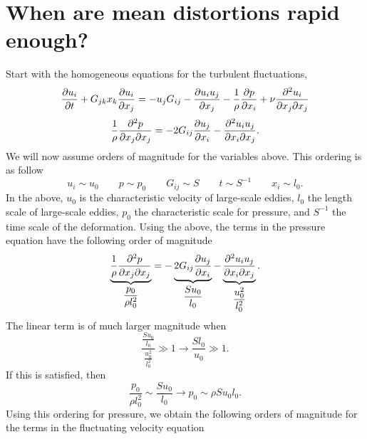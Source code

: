 \documentclass[oneside,a4paper,11pt]{report}
\begin{document}
\section{When are mean distortions rapid enough?}
Start with the homogeneous equations for the turbulent fluctuations,
\begin{equation}
\frac{\partial u_i}{\partial t} + G_{jk} x_k \frac{\partial u_i}{\partial x_j} = -u_j G_{ij} - \frac{\partial u_i u_j}{\partial x_j} - \frac{1}{\rho} \frac{\partial p}{\partial x_i} + \nu \frac{\partial^2 u_i}{\partial x_j \partial x_j} 
\end{equation}
\begin{equation}
\frac{1}{\rho} \frac{\partial^2 p}{\partial x_j \partial x_j} = -2 G_{ij} \frac{\partial u_j}{\partial x_i} - \frac{\partial^2 u_i u_j}{\partial x_i \partial x_j}.
\end{equation}
We will now assume orders of magnitude for the variables above. This ordering is as follow
\begin{equation}
    u_i \sim u_0 \qquad p \sim p_0 \qquad G_{ij} \sim S \qquad t \sim S^{-1} \qquad x_i \sim l_0.  
\end{equation}
In the above, $u_0$ is the characteristic velocity of large-scale eddies, $l_0$ the length scale of large-scale eddies, $p_0$ the characteristic scale for pressure, and $S^{-1}$ the time scale of the deformation. Using the above, the terms in the pressure equation have the following order of magnitude
\begin{equation}
\underbrace{\frac{1}{\rho} \frac{\partial^2 p}{\partial x_j \partial x_j}}_{\dfrac{p_0}{\rho l_0^2}} = -\underbrace{2 G_{ij} \frac{\partial u_j}{\partial x_i}}_{\dfrac{S u_0}{l_0}} - \underbrace{\frac{\partial^2 u_i u_j}{\partial x_i \partial x_j}}_{\dfrac{u_0^2}{l_0^2}}.
\end{equation}
The linear term is of much larger magnitude when
\begin{equation}
\frac{\frac{Su_0}{l_0}}{\frac{u_0^2}{l_0^2}} \gg 1 \to \frac{S l_0}{u_0} \gg 1.
\end{equation}
If this is satisfied, then 
\begin{equation}
\frac{p_0}{\rho l_0^2} \sim \frac{S u_0}{l_0} \to p_0 \sim \rho S u_0 l_0.
\end{equation}
Using this ordering for pressure, we obtain the following orders of magnitude for the terms in the fluctuating velocity equation
\end{document}
